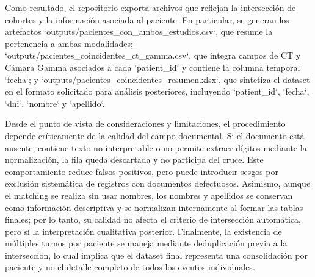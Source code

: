 Como resultado, el repositorio exporta archivos que reflejan la intersección de cohortes y la información asociada al paciente. En particular, se generan los artefactos `outputs/pacientes_con_ambos_estudios.csv`, que resume la pertenencia a ambas modalidades; `outputs/pacientes_coincidentes_ct_gamma.csv`, que integra campos de CT y Cámara Gamma asociados a cada `patient_id` y contiene la columna temporal `fecha`; y `outputs/pacientes_coincidentes_resumen.xlsx`, que sintetiza el dataset en el formato solicitado para análisis posteriores, incluyendo `patient_id`, `fecha`, `dni`, `nombre` y `apellido`.

Desde el punto de vista de consideraciones y limitaciones, el procedimiento depende críticamente de la calidad del campo documental. Si el documento está ausente, contiene texto no interpretable o no permite extraer dígitos mediante la normalización, la fila queda descartada y no participa del cruce. Este comportamiento reduce falsos positivos, pero puede introducir sesgos por exclusión sistemática de registros con documentos defectuosos. Asimismo, aunque el matching se realiza sin usar nombres, los nombres y apellidos se conservan como información descriptiva y se normalizan internamente al formar las tablas finales; por lo tanto, su calidad no afecta el criterio de intersección automática, pero sí la interpretación cualitativa posterior. Finalmente, la existencia de múltiples turnos por paciente se maneja mediante deduplicación previa a la intersección, lo cual implica que el dataset final representa una consolidación por paciente y no el detalle completo de todos los eventos individuales.
